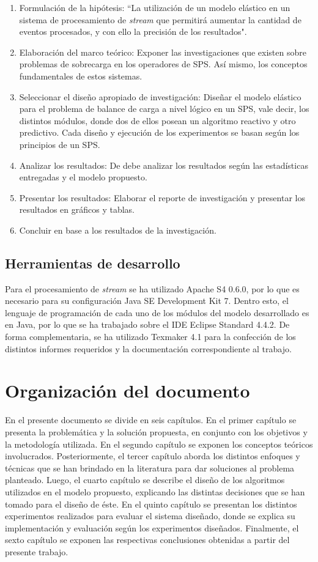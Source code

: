 \begin{enumerate}
	\item Formulación de la hipótesis: ``La utilización de un modelo elástico en un sistema de procesamiento de \textit{stream} que permitirá aumentar la cantidad de eventos procesados, y con ello la precisión de los resultados".
	\item Elaboración del marco teórico: Exponer las investigaciones que existen sobre problemas de sobrecarga en los operadores de SPS. Así mismo, los conceptos fundamentales de estos sistemas.
	\item Seleccionar el diseño apropiado de investigación: Diseñar el modelo elástico para el problema de balance de carga a nivel lógico en un SPS, vale decir, los distintos módulos, donde dos de ellos posean un algoritmo reactivo y otro predictivo. Cada diseño y ejecución de los experimentos se basan según los principios de un SPS.
	\item Analizar los resultados: De debe analizar los resultados según las estadísticas entregadas y el modelo propuesto.
	\item Presentar los resultados: Elaborar el reporte de investigación y presentar los resultados en gráficos y tablas.
	\item Concluir en base a los resultados de la investigación.
\end{enumerate}

\subsection{Herramientas de desarrollo}
Para el procesamiento de \textit{stream} se ha utilizado Apache S4 0.6.0, por lo que es necesario para su configuración Java SE Development Kit 7. Dentro esto, el lenguaje de programación de cada uno de los módulos del modelo desarrollado es en Java, por lo que se ha trabajado sobre el IDE Eclipse Standard 4.4.2. De forma complementaria, se ha utilizado Texmaker 4.1 para la confección de los distintos informes requeridos y la documentación correspondiente al trabajo.

\section{Organización del documento}
\label{intro:organizacion}
En el presente documento se divide en seis capítulos. En el primer capítulo se presenta la problemática y la solución propuesta, en conjunto con los objetivos y la metodología utilizada. En el segundo capítulo se exponen los conceptos teóricos involucrados. Posteriormente, el tercer capítulo aborda los distintos enfoques y técnicas que se han brindado en la literatura para dar soluciones al problema planteado. Luego, el cuarto capítulo se describe el diseño de los algoritmos utilizados en el modelo propuesto, explicando las distintas decisiones que se han tomado para el diseño de éste. En el quinto capítulo se presentan los distintos experimentos realizados para evaluar el sistema diseñado, donde se explica su implementación y evaluación según los experimentos diseñados. Finalmente, el sexto capítulo se exponen las respectivas conclusiones obtenidas a partir del presente trabajo.